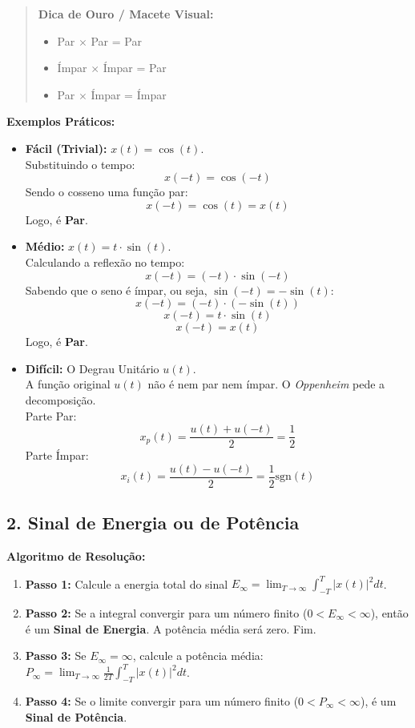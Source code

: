\begin{quote}
\textbf{Dica de Ouro / Macete Visual:}

\begin{itemize}
\tightlist
\item
  Par \(\times\) Par = Par
\item
  Ímpar \(\times\) Ímpar = Par
\item
  Par \(\times\) Ímpar = Ímpar
\end{itemize}
\end{quote}

\textbf{Exemplos Práticos:}

\begin{itemize}
\item
  \textbf{Fácil (Trivial):} \(x(t) = \cos(t)\).\\
  Substituindo o tempo:
  \[x(-t) = \cos(-t)\]
  Sendo o cosseno uma função par:
  \[x(-t) = \cos(t) = x(t)\]
  Logo, é \textbf{Par}.
\item
  \textbf{Médio:} \(x(t) = t \cdot \sin(t)\).\\
  Calculando a reflexão no tempo:
  \[x(-t) = (-t) \cdot \sin(-t)\]
  Sabendo que o seno é ímpar, ou seja, \(\sin(-t) = -\sin(t)\):
  \[x(-t) = (-t) \cdot (-\sin(t))\]
  \[x(-t) = t \cdot \sin(t)\]
  \[x(-t) = x(t)\]
  Logo, é \textbf{Par}.
\item
  \textbf{Difícil:} O Degrau Unitário \(u(t)\).\\
  A função original \(u(t)\) não é nem par nem ímpar. O \emph{Oppenheim} pede a decomposição.\\
  Parte Par:
  \[x_p(t) = \frac{u(t) + u(-t)}{2} = \frac{1}{2}\]
  Parte Ímpar:
  \[x_i(t) = \frac{u(t) - u(-t)}{2} = \frac{1}{2}\text{sgn}(t)\]
\end{itemize}

\subsection{2. Sinal de Energia ou de Potência}\label{sinal-de-energia-ou-de-potuxeancia}

\textbf{Algoritmo de Resolução:}

\begin{enumerate}
\def\labelenumi{\arabic{enumi}.}
\tightlist
\item
  \textbf{Passo 1:} Calcule a energia total do sinal \(E_\infty = \lim_{T \to \infty} \int_{-T}^{T} |x(t)|^2 dt\).
\item
  \textbf{Passo 2:} Se a integral convergir para um número finito (\(0 < E_\infty < \infty\)), então é um \textbf{Sinal de Energia}. A potência média será zero. Fim.
\item
  \textbf{Passo 3:} Se \(E_\infty = \infty\), calcule a potência média: \(P_\infty = \lim_{T \to \infty} \frac{1}{2T} \int_{-T}^{T} |x(t)|^2 dt\).
\item
  \textbf{Passo 4:} Se o limite convergir para um número finito (\(0 < P_\infty < \infty\)), é um \textbf{Sinal de Potência}.
\end{enumerate}

